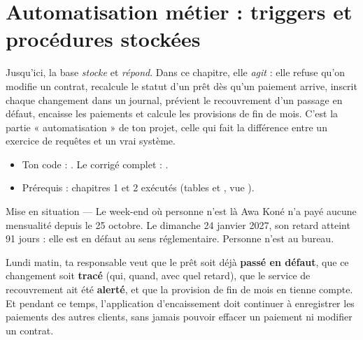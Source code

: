 \chapter{Automatisation métier : triggers et procédures stockées}


Jusqu'ici, la base \emph{stocke} et \emph{répond}. Dans ce chapitre, elle \emph{agit} : elle refuse
qu'on modifie un contrat, recalcule le statut d'un prêt dès qu'un paiement arrive, inscrit chaque
changement dans un journal, prévient le recouvrement d'un passage en défaut, encaisse les paiements et
calcule les provisions de fin de mois. C'est la partie « automatisation » de ton projet, celle qui fait
la différence entre un exercice de requêtes et un vrai système.

\begin{observation}
\begin{itemize}
\item Ton code : . Le corrigé complet : .
\item Prérequis : chapitres 1 et 2 exécutés (tables  et
, vue ).
\end{itemize}
\end{observation}

\begin{situation}{Mise en situation --- Le week-end où personne n'est là}
Awa Koné n'a payé aucune mensualité depuis le 25 octobre. Le dimanche 24 janvier 2027, son retard
atteint 91 jours : elle est en défaut au sens réglementaire. Personne n'est au bureau.

Lundi matin, ta responsable veut que le prêt soit déjà \textbf{passé en défaut}, que ce changement soit
\textbf{tracé} (qui, quand, avec quel retard), que le service de recouvrement ait été \textbf{alerté},
et que la provision de fin de mois en tienne compte. Et pendant ce temps, l'application d'encaissement
doit continuer à enregistrer les paiements des autres clients, sans jamais pouvoir effacer un paiement
ni modifier un contrat.
\end{situation}

